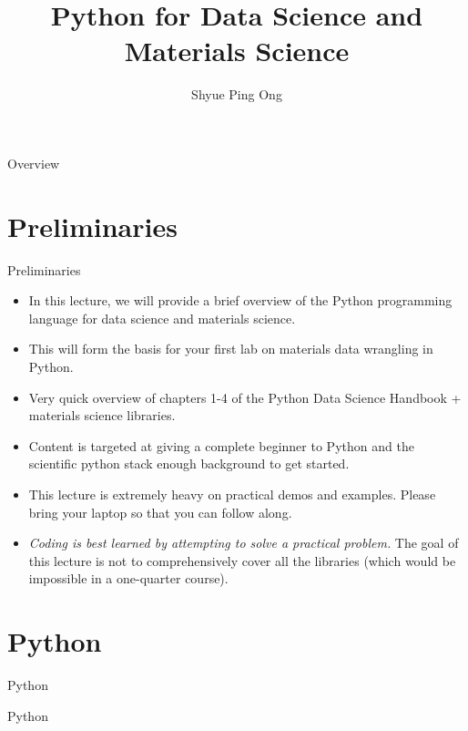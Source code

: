 \documentclass[aspectratio=169]{beamer}
\title[Python for Data Science and Materials Science]{Python for Data Science and Materials Science}
\author{Shyue Ping Ong}
\institute[UCSD]{University of California, San Diego\\
\medskip
}
\date{\classyear} %
\begin{document}
    \begin{frame}
        \titlepage %
    \end{frame}


    \begin{frame}{Overview}
        \tableofcontents
    \end{frame}


    \section{Preliminaries}

    \begin{frame}{Preliminaries}
        \begin{itemize}
            \item In this lecture, we will provide a brief overview of the Python programming language for data science and materials science.
            \item This will form the basis for your first lab on materials data wrangling in Python.
            \item Very quick overview of chapters 1-4 of the Python Data Science Handbook\cite{vanderplasPythonDataScience2016} + materials science libraries.
            \item Content is targeted at giving a complete beginner to Python and the scientific python stack enough background to get started.
            \item This lecture is extremely heavy on practical demos and examples. Please bring your laptop so that you can follow along.
            \item \textit{Coding is best learned by attempting to solve a practical problem.} The goal of this lecture is not to comprehensively cover all the libraries (which would be impossible in a one-quarter course).
        \end{itemize}
    \end{frame}


    \section{Python}

    \begin{frame}{Python}
        \Huge{\centerline{Python}}
    \end{frame}
\end{document}
